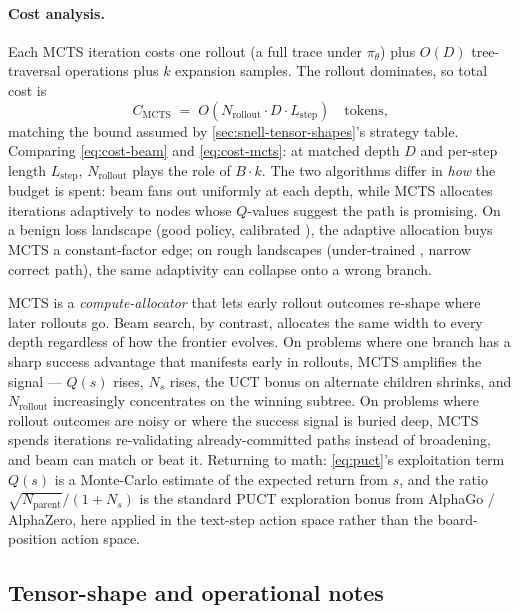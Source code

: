 \paragraph{Cost analysis.} Each MCTS iteration costs one rollout (a
full trace under $\pi_\theta$) plus $O(D)$ tree-traversal operations
plus $k$ expansion samples. The rollout dominates, so total cost is
\begin{equation}
  C_\text{MCTS} \;=\; O\!\left( N_\text{rollout} \cdot D \cdot L_\text{step} \right)
  \quad\text{tokens,}
  \label{eq:cost-mcts}
\end{equation}
matching the bound assumed by \cref{sec:snell-tensor-shapes}'s strategy
table. Comparing \cref{eq:cost-beam} and \cref{eq:cost-mcts}: at
matched depth $D$ and per-step length $L_\text{step}$, $N_\text{rollout}$
plays the role of $B \cdot k$. The two algorithms differ in
\emph{how} the budget is spent: beam fans out uniformly at each depth,
while MCTS allocates iterations adaptively to nodes whose $Q$-values
suggest the path is promising. On a benign loss landscape (good policy,
calibrated ), the adaptive allocation buys MCTS a constant-factor
edge; on rough landscapes (under-trained , narrow correct path),
the same adaptivity can collapse onto a wrong branch.

\begin{intuition}
MCTS is a \emph{compute-allocator} that lets early rollout outcomes
re-shape where later rollouts go. Beam search, by contrast, allocates
the same width to every depth regardless of how the frontier evolves.
On problems where one branch has a sharp success advantage that
manifests early in rollouts, MCTS amplifies the signal --- $Q(s)$
rises, $N_s$ rises, the UCT bonus on alternate children shrinks, and
$N_\text{rollout}$ increasingly concentrates on the winning subtree.
On problems where rollout outcomes are noisy or where the success
signal is buried deep, MCTS spends iterations re-validating
already-committed paths instead of broadening, and beam can match or
beat it. Returning to math: \cref{eq:puct}'s exploitation term $Q(s)$
is a Monte-Carlo estimate of the expected return from $s$, and the
ratio $\sqrt{N_\text{parent}}/(1 + N_s)$ is the standard PUCT
exploration bonus from AlphaGo / AlphaZero, here applied in the
text-step action space rather than the board-position action space.
\end{intuition}

\subsection{Tensor-shape and operational notes}
\label{sec:tree-shapes}

